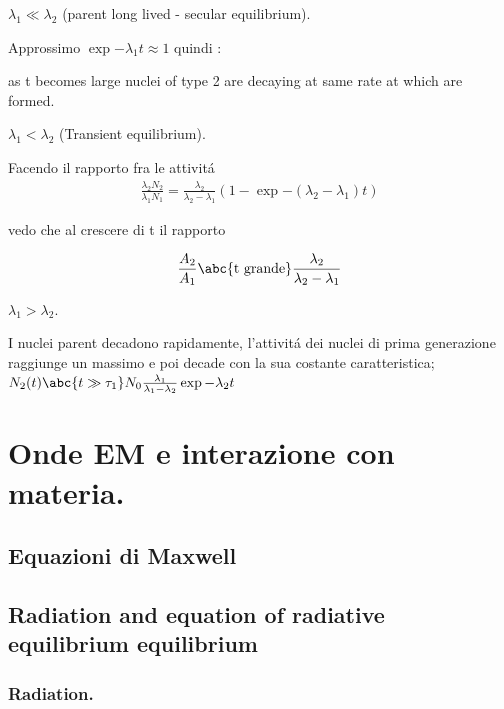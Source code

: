 \begin{enumerate*}

\item $\lambda_1\ll\lambda_2$ (parent long lived - secular equilibrium).

Approssimo $\exp{-\lambda_1}t\approx1$ quindi :

as t becomes large nuclei of type 2 are decaying at same rate at which are formed. 


\item $\lambda_1<\lambda_2$ (Transient equilibrium).

Facendo il rapporto fra le attivit\'a
\begin{align*}
\frac{\lambda_2N_2}{\lambda_1N_1}=\frac{\lambda_2}{\lambda_2-\lambda_1}(1-\exp{-(\lambda_2-\lambda_1)t})
\end{align*}

vedo che al crescere di t il rapporto

\begin{align*}
\frac{A_2}{A_1}\abc{\text{t grande}}\frac{\lambda_2}{\lambda_2-\lambda_1}
\end{align*}


\item $\lambda_1>\lambda_2$.

I nuclei parent decadono rapidamente, l'attivit\'a dei nuclei di prima generazione raggiunge un massimo e poi decade con la sua costante caratteristica; $N_2(t)\abc{t\gg\tau_1}N_0\frac{\lambda_1}{\lambda_1-\lambda_2}\exp{-\lambda_2t}$

\end{enumerate*}


\chapter{Onde EM e interazione con materia.}
\PartialToc

\section{Equazioni di Maxwell}

\section{Radiation and equation of radiative equilibrium equilibrium}

\subsection{Radiation.}

